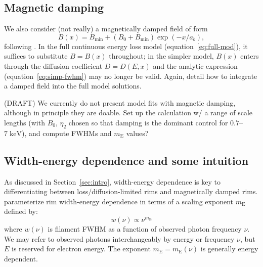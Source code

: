 \documentclass[iop, apj, numberedappendix]{emulateapj}
\newcommand*{\mt}{\mathrm}
\newcommand*{\unit}[1]{\;\mt{#1}}  %
\newcommand*{\mE}{m_\mt{E}}
\begin{document}
\subsection{Magnetic damping}

We also consider (not really) a magnetically damped field of form
\begin{equation}
    B(x) = B_{\mt{min}} + \left(B_0 + B_{\mt{min}}\right) \exp\left(-x / a_b\right) ,
\end{equation}
following \citet{pohl2005}.
In the full continuous energy loss model (equation~\eqref{eq:full-mod}), it
suffices to substitute $B = B(x)$ throughout; in the simpler model, $B(x)$
enters through the diffusion coefficient $D = D(E,x)$ and the analytic
expression (equation~\eqref{eq:simp-fwhm}) may no longer be valid.
Again,  detail how to integrate a damped field into the
full model solutions.

(DRAFT) We currently do not present model fits with magnetic damping, although
in principle they are doable.  Set up the calculation w/ a range of scale
lengths (with $B_0$, $\eta_2$ chosen so that damping is the dominant control
for $0.7$--$7 \unit{keV}$), and compute FWHMs and $\mE$ values?

\subsection{Width-energy dependence and some intuition} \label{sec:energydep}

As discussed in Section~\ref{sec:intro}, width-energy dependence is key to
differentiating between loss/diffusion-limited rims and magnetically damped
rims.   parameterize rim width-energy dependence in
terms of a scaling exponent $\mE$ defined by:
\begin{equation}
    w(\nu) \propto \nu^{\mE}
\end{equation}
where $w(\nu)$ is filament FWHM as a function of observed photon frequency
$\nu$.  We may refer to observed photons interchangeably by energy or frequency
$\nu$, but $E$ is reserved for electron energy.  The exponent $\mE = \mE(\nu)$
is generally energy dependent.
\end{document}
